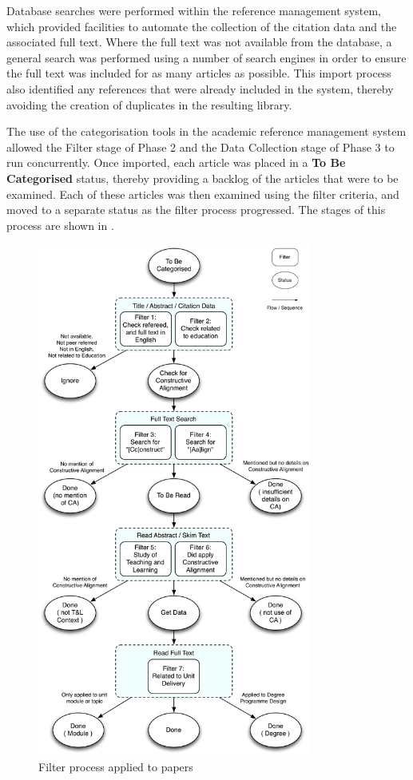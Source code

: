 Database searches were performed within the reference management system, which provided facilities to automate the collection of the citation data and the associated full text. Where the full text was not available from the database, a general search was performed using a number of search engines in order to ensure the full text was included for as many articles as possible. This import process also identified any references that were already included in the system, thereby avoiding the creation of duplicates in the resulting library.

The use of the categorisation tools in the academic reference management system allowed the Filter stage of Phase 2 and the Data Collection stage of Phase 3 to run concurrently. Once imported, each article was placed in a \textbf{To Be Categorised} status, thereby providing a backlog of the articles that were to be examined. Each of these articles was then examined using the filter criteria, and moved to a separate status as the filter process progressed. The stages of this process are shown in .

\begin{figure}[tbph]
	\centering
	\includegraphics[width=0.8\textwidth]{FilterProcess}
	\caption{Filter process applied to papers}
	\label{fig:filter_proc}
\end{figure}

